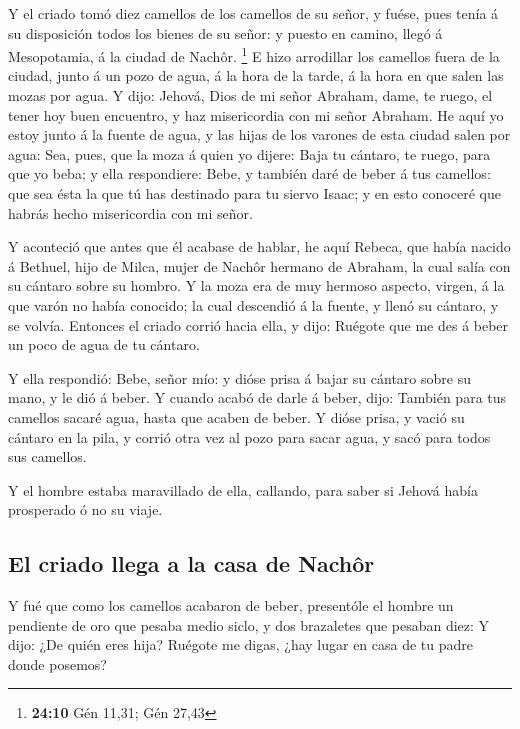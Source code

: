  Y el criado tomó diez camellos de los camellos de su
señor, y fuése, pues tenía á su disposición todos los bienes de su
señor: y puesto en camino, llegó á Mesopotamia, á la ciudad de Nachôr.
\footnote{\textbf{24:10} Gén 11,31; Gén 27,43}  E hizo
arrodillar los camellos fuera de la ciudad, junto á un pozo de agua, á
la hora de la tarde, á la hora en que salen las mozas por agua.
 Y dijo: Jehová, Dios de mi señor Abraham, dame, te
ruego, el tener hoy buen encuentro, y haz misericordia con mi señor
Abraham.  He aquí yo estoy junto á la fuente de agua, y
las hijas de los varones de esta ciudad salen por agua: 
Sea, pues, que la moza á quien yo dijere: Baja tu cántaro, te ruego,
para que yo beba; y ella respondiere: Bebe, y también daré de beber á
tus camellos: que sea ésta la que tú has destinado para tu siervo Isaac;
y en esto conoceré que habrás hecho misericordia con mi señor.

 Y aconteció que antes que él acabase de hablar, he aquí
Rebeca, que había nacido á Bethuel, hijo de Milca, mujer de Nachôr
hermano de Abraham, la cual salía con su cántaro sobre su hombro.
 Y la moza era de muy hermoso aspecto, virgen, á la que
varón no había conocido; la cual descendió á la fuente, y llenó su
cántaro, y se volvía.  Entonces el criado corrió hacia
ella, y dijo: Ruégote que me des á beber un poco de agua de tu cántaro.

 Y ella respondió: Bebe, señor mío: y dióse prisa á bajar
su cántaro sobre su mano, y le dió á beber.  Y cuando
acabó de darle á beber, dijo: También para tus camellos sacaré agua,
hasta que acaben de beber.  Y dióse prisa, y vació su
cántaro en la pila, y corrió otra vez al pozo para sacar agua, y sacó
para todos sus camellos.

 Y el hombre estaba maravillado de ella, callando, para
saber si Jehová había prosperado ó no su viaje.

\hypertarget{el-criado-llega-a-la-casa-de-nachuxf4r}{%
\subsection{El criado llega a la casa de
Nachôr}\label{el-criado-llega-a-la-casa-de-nachuxf4r}}

 Y fué que como los camellos acabaron de beber,
presentóle el hombre un pendiente de oro que pesaba medio siclo, y dos
brazaletes que pesaban diez:  Y dijo: ¿De quién eres
hija? Ruégote me digas, ¿hay lugar en casa de tu padre donde posemos?

